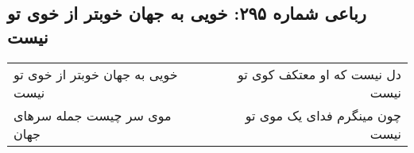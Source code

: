 \begin{center}
\section*{رباعی شماره ۲۹۵: خویی به جهان خوبتر از خوی تو نیست}
\label{sec:0295}
\begin{longtable}{l p{0.5cm} r}
خویی به جهان خوبتر از خوی تو نیست
&&
دل نیست که او معتکف کوی تو نیست
\\
موی سر چیست جمله سرهای جهان
&&
چون مینگرم فدای یک موی تو نیست
\\
\end{longtable}
\end{center}
